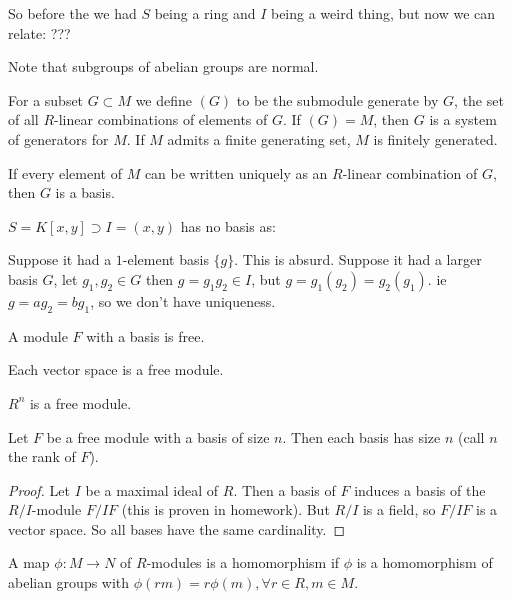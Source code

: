 So before the we had $S$ being a ring and $I$ being a weird thing, but now we can relate: ???



Note that subgroups of abelian groups are normal.
\begin{definition}
For a subset $G \subset M$ we define $(G)$ to be the submodule generate by $G$, the set of all $R$-linear combinations of elements of $G$. If $(G) = M$, then $G$ is a system of generators for $M$. If $M$ admits a finite generating set, $M$ is finitely generated.
\end{definition}

\begin{definition}
If every element of $M$ can be written uniquely as an $R$-linear combination of $G$, then $G$ is a basis.
\end{definition}

\begin{nexample}
$S = K [ x,y] \supset I = (x,y) $ has no basis as:

Suppose it had a $1$-element basis $\{g \}$. This is absurd.
Suppose it had a larger basis $G$, let $g_1, g_2 \in G$ then $g = g_1 g_2 \in I$, but $g = g_1 (g_2) = g_2 (g_1)$. ie $g = a g_2 = bg_1$, so we don't have uniqueness.
\end{nexample}

\begin{definition}
A module $F$ with a basis is free.
\end{definition}

\begin{example}
Each vector space is a free module.
\end{example}

\begin{example}
$R^n$ is a free module.
\end{example}

\begin{lemma}
Let $F$ be a free module with a basis of size $n$. Then each basis has size $n$ (call $n$ the rank of $F$).
\end{lemma}

\begin{proof}
Let $I$ be a maximal ideal of $R$. Then a basis of $F$ induces a basis of the $R/I$-module $F/IF$ (this is proven in homework).
But $R/I$ is a field, so $F/IF$ is a vector space. So all bases have the same cardinality.
\end{proof}

\begin{definition}
A map $\phi: M \to N$ of $R$-modules is a homomorphism if $\phi$ is a homomorphism of abelian groups with $\phi(rm) = r \phi(m), \forall r \in R, m \in M$.
\end{definition}

